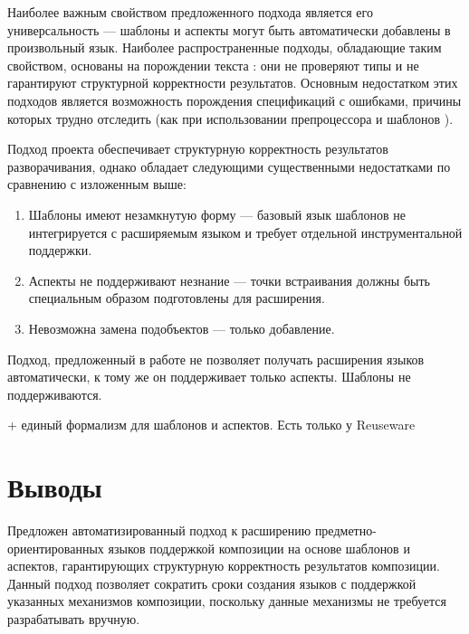 Наиболее важным свойством предложенного подхода является его универсальность --- шаблоны и аспекты могут быть автоматически добавлены в произвольный язык. Наиболее распространенные подходы, обладающие таким свойством, основаны на порождении текста \cite{???}: они не проверяют типы и не гарантируют структурной корректности результатов. Основным недостатком этих подходов является возможность порождения спецификаций с ошибками, причины которых трудно отследить (как при использовании препроцессора  и шаблонов ).

Подход проекта  \cite{???} обеспечивает структурную корректность результатов разворачивания, однако обладает следующими существенными недостатками по сравнению с изложенным выше:
\begin{enumerate}
\item Шаблоны имеют незамкнутую форму --- базовый язык шаблонов не интегрируется с расширяемым языком и требует отдельной инструментальной поддержки.
\item Аспекты не поддерживают незнание --- точки встраивания должны быть специальным образом подготовлены для расширения.
\item Невозможна замена подобъектов --- только добавление. 
\end{enumerate}

Подход, предложенный в работе \cite{VanWyk} не позволяет получать расширения языков автоматически, к тому же он поддерживает только аспекты. Шаблоны не поддерживаются.

+ единый формализм для шаблонов и аспектов. Есть только у Reuseware

\chapter{Выводы}

Предложен автоматизированный подход к расширению предметно-ориентированных языков поддержкой композиции на основе шаблонов и аспектов, гарантирующих структурную корректность результатов композиции. Данный подход позволяет сократить сроки создания языков с поддержкой указанных механизмов композиции, поскольку данные механизмы не требуется разрабатывать вручную.